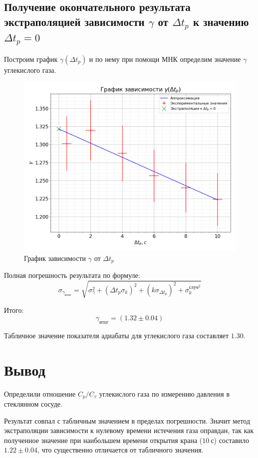 \documentclass[a4paper, 12pt]{article}
\begin{document}
		\subsection{Получение окончательного результата экстраполяцией зависимости $\gamma$ от $\Delta t_p$ к значению $\Delta t_p = 0$}

		Построим график $\gamma(\Delta t_p)$ и по нему при помощи МНК определим значение $\gamma$ углекислого газа.

		\begin{figure}[!ht]
			\begin{center}
				\includegraphics[width=0.6 \textwidth]{img/plot_gamma_t.png}
			\end{center}
			\caption{График зависимости $\gamma$ от $\Delta t_p$}
			\label{plot:gamma_t}
		\end{figure}

		Полная погрешность результата по формуле:
		$$
			\sigma_{\gamma_{итог}} = \sqrt{\sigma_{\gamma}^2 + \left( \Delta t_p \sigma_k \right)^2 + \left( k \sigma_{\Delta t_p} \right)^2 + \sigma_k^{случ^2}}
		$$

		Итого:
		$$
			\gamma_{итог} = (1.32 \pm 0.04)
		$$

		Табличное значение показателя адиабаты для углекислого газа составляет $1.30$.

	\section{Вывод}

		Определили отношение $C_p / C_v$ углекислого газа по измерению давления в стеклянном сосуде.

		Результат совпал с табличным значением в пределах погрешности. Значит метод экстраполяции зависимости к нулевому времени истечения газа оправдан, так как полученное значение при наибольшем времени открытия крана ($10~с$) составило $1.22 \pm 0.04$, что существенно отличается от табличного значения.
\end{document}
